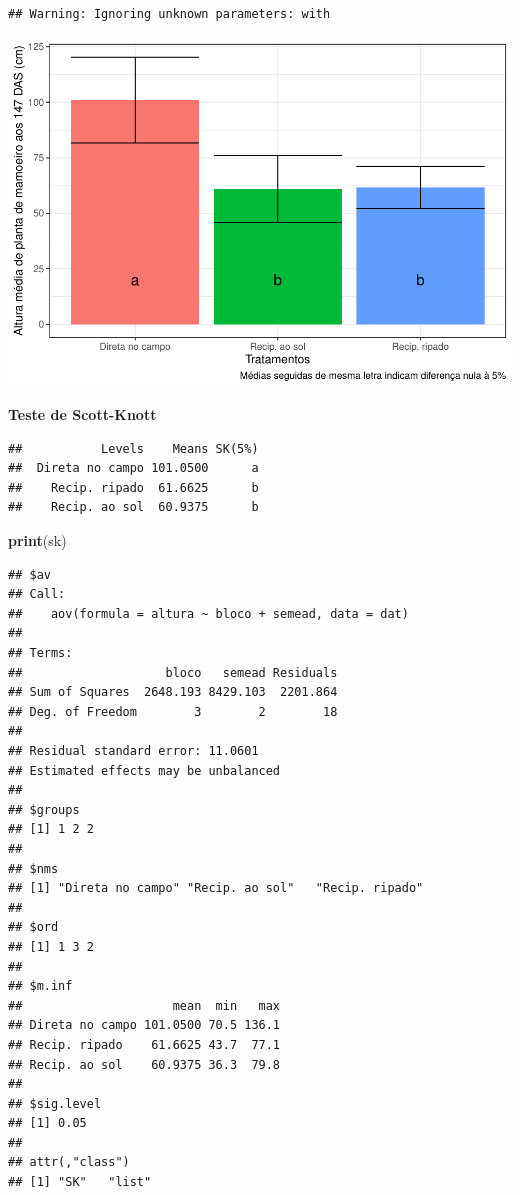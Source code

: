 \documentclass[
]{book}
\newenvironment{Shaded}{\begin{snugshade}}{\end{snugshade}}
\newcommand{\DataTypeTok}[1]{\textcolor[rgb]{0.13,0.29,0.53}{#1}}
\newcommand{\KeywordTok}[1]{\textcolor[rgb]{0.13,0.29,0.53}{\textbf{#1}}}
\newcommand{\NormalTok}[1]{#1}
\newcommand{\OperatorTok}[1]{\textcolor[rgb]{0.81,0.36,0.00}{\textbf{#1}}}
\newcommand{\StringTok}[1]{\textcolor[rgb]{0.31,0.60,0.02}{#1}}
\begin{document}
\begin{verbatim}
## Warning: Ignoring unknown parameters: with
\end{verbatim}

\includegraphics{TudodoR_files/figure-latex/unnamed-chunk-320-1.pdf}

\textbf{Teste de Scott-Knott}

\begin{Shaded}
\end{Shaded}

\begin{verbatim}
##           Levels    Means SK(5%)
##  Direta no campo 101.0500      a
##    Recip. ripado  61.6625      b
##    Recip. ao sol  60.9375      b
\end{verbatim}

\begin{Shaded}
\begin{Highlighting}[]
\KeywordTok{print}\NormalTok{(sk)}
\end{Highlighting}
\end{Shaded}

\begin{verbatim}
## $av
## Call:
##    aov(formula = altura ~ bloco + semead, data = dat)
## 
## Terms:
##                    bloco   semead Residuals
## Sum of Squares  2648.193 8429.103  2201.864
## Deg. of Freedom        3        2        18
## 
## Residual standard error: 11.0601
## Estimated effects may be unbalanced
## 
## $groups
## [1] 1 2 2
## 
## $nms
## [1] "Direta no campo" "Recip. ao sol"   "Recip. ripado"  
## 
## $ord
## [1] 1 3 2
## 
## $m.inf
##                     mean  min   max
## Direta no campo 101.0500 70.5 136.1
## Recip. ripado    61.6625 43.7  77.1
## Recip. ao sol    60.9375 36.3  79.8
## 
## $sig.level
## [1] 0.05
## 
## attr(,"class")
## [1] "SK"   "list"
\end{verbatim}
\end{document}

